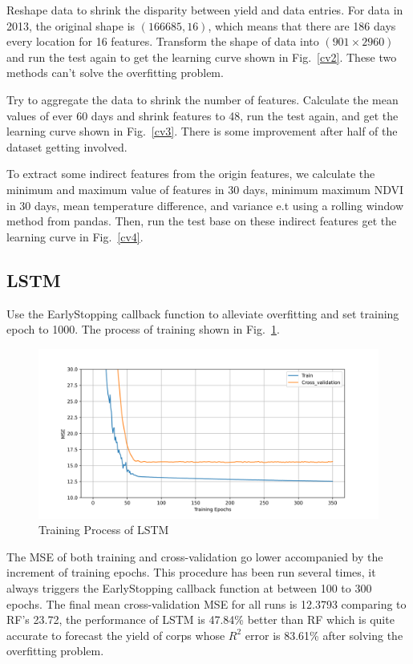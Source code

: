 \documentclass[conference, a4paper]{IEEEtran}
\begin{document}
  Reshape data to shrink the disparity between yield and data entries. For data in 2013, the original shape is $(166685,16)$, which means that there are 186 days every location for 16 features. Transform the shape of data into $(901\times2960)$ and run the test again to get the learning curve shown in Fig.~\ref{cv2}. These two methods can't solve the overfitting problem.

  Try to aggregate the data to shrink the number of features. Calculate the mean values of ever 60 days and shrink features to 48, run the test again, and get the learning curve shown in Fig.~\ref{cv3}. There is some improvement after half of the dataset getting involved.

  To extract some indirect features from the origin features, we calculate the minimum and maximum value of features in 30 days, minimum maximum NDVI in 30 days, mean temperature difference, and variance e.t using a rolling window method from pandas. Then, run the test base on these indirect features get the learning curve in Fig.~\ref{cv4}.

\subsection{LSTM}
  Use the EarlyStopping callback function to alleviate overfitting and set training epoch to 1000. The process of training shown in Fig.~\ref{fig:train}.

  \begin{figure}[htbp]
    \centerline{\includegraphics[width=\linewidth]{figures/lp.png}}
    \caption{Training Process of LSTM}
    \label{fig:train}
  \end{figure}

  The MSE of both training and cross-validation go lower accompanied by the increment of training epochs. This procedure has been run several times, it always triggers the EarlyStopping callback function at between 100 to 300 epochs. The final mean cross-validation MSE for all runs is 12.3793 comparing to RF's 23.72, the performance of LSTM is 47.84\% better than RF which is quite accurate to forecast the yield of corps whose $R^2$ error is 83.61\% after solving the overfitting problem.
\end{document}
